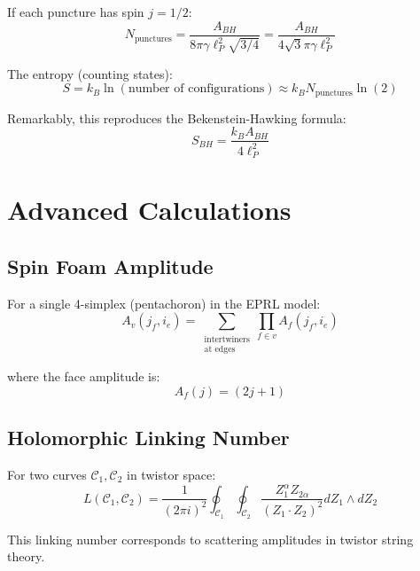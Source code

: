 \documentclass[12pt,a4paper]{article}
\theoremstyle{definition}
\begin{document}
If each puncture has spin $j=1/2$:
\begin{equation}
N_{\text{punctures}} = \frac{A_{BH}}{8\pi\gamma\ell_P^2\sqrt{3/4}} = \frac{A_{BH}}{4\sqrt{3}\pi\gamma\ell_P^2}
\end{equation}

The entropy (counting states):
\begin{equation}
S = k_B \ln(\text{number of configurations}) \approx k_B N_{\text{punctures}} \ln(2) 
\end{equation}

Remarkably, this reproduces the Bekenstein-Hawking formula:
\begin{equation}
S_{BH} = \frac{k_B A_{BH}}{4\ell_P^2}
\end{equation}

\section{Advanced Calculations}

\subsection{Spin Foam Amplitude}

For a single 4-simplex (pentachoron) in the EPRL model:
\begin{equation}
A_v(j_f, i_e) = \sum_{\substack{\text{intertwiners} \\ \text{at edges}}} \prod_{f \in v} A_f(j_f, i_e)
\end{equation}

where the face amplitude is:
\begin{equation}
A_f(j) = (2j+1)
\end{equation}

\subsection{Holomorphic Linking Number}

For two curves $\mathcal{C}_1, \mathcal{C}_2$ in twistor space:
\begin{equation}
L(\mathcal{C}_1, \mathcal{C}_2) = \frac{1}{(2\pi i)^2}\oint_{\mathcal{C}_1}\oint_{\mathcal{C}_2} \frac{Z_1^\alpha Z_{2\alpha}}{(Z_1 \cdot Z_2)^2} dZ_1 \wedge dZ_2
\end{equation}

This linking number corresponds to scattering amplitudes in twistor string theory.
\end{document}
